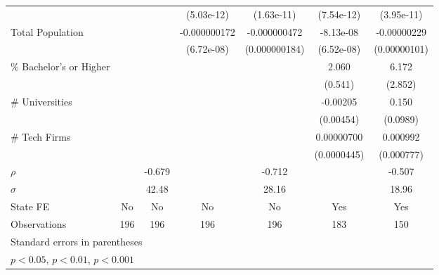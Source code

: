 {\begin{tabular}{l*{6}{c}}
                    &                     &                     &  (5.03e-12)         &  (1.63e-11)         &  (7.54e-12)         &  (3.95e-11)         \\
\addlinespace
Total Population    &                     &                     &-0.000000172\sym{*}  &-0.000000472\sym{*}  &   -8.13e-08         & -0.00000229\sym{*}  \\
                    &                     &                     &  (6.72e-08)         &(0.000000184)         &  (6.52e-08)         &(0.00000101)         \\
\addlinespace
\% Bachelor's or Higher&                     &                     &                     &                     &       2.060\sym{***}&       6.172\sym{*}  \\
                    &                     &                     &                     &                     &     (0.541)         &     (2.852)         \\
\addlinespace
\# Universities     &                     &                     &                     &                     &    -0.00205         &       0.150         \\
                    &                     &                     &                     &                     &   (0.00454)         &    (0.0989)         \\
\addlinespace
\# Tech Firms       &                     &                     &                     &                     &  0.00000700         &    0.000992         \\
                    &                     &                     &                     &                     & (0.0000445)         &  (0.000777)         \\
\midrule
\(\rho\)            &                     &      -0.679         &                     &      -0.712         &                     &      -0.507         \\
\(\sigma\)          &                     &       42.48         &                     &       28.16         &                     &       18.96         \\
State FE            &          No         &          No         &          No         &          No         &         Yes         &         Yes         \\
Observations        &         196         &         196         &         196         &         196         &         183         &         150         \\
\bottomrule
\multicolumn{7}{l}{\footnotesize Standard errors in parentheses}\\
\multicolumn{7}{l}{\footnotesize \sym{*} \(p<0.05\), \sym{**} \(p<0.01\), \sym{***} \(p<0.001\)}\\
\end{tabular}
}
